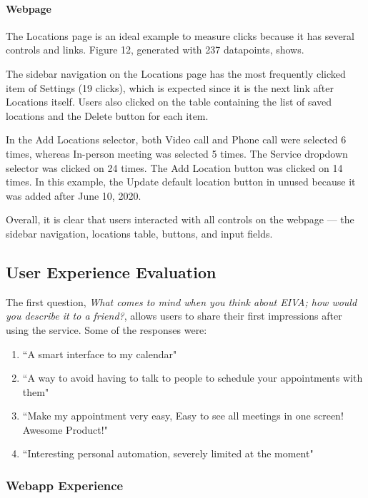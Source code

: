\documentclass{article}
\begin{document}
\paragraph{Webpage}

The Locations page is an ideal example to measure clicks because it has several controls and links. Figure 12, generated with 237 datapoints, shows.

The sidebar navigation on the Locations page has the most frequently clicked item of Settings (19 clicks), which is expected since it is the next link after Locations itself. Users also clicked on the table containing the list of saved locations and the Delete button for each item.

In the Add Locations selector, both Video call and Phone call were selected 6 times, whereas In-person meeting was selected 5 times. The Service dropdown selector was clicked on 24 times. The Add Location button was clicked on 14 times. In this example, the Update default location button in unused because it was added after June 10, 2020.

Overall, it is clear that users interacted with all controls on the webpage --- the sidebar navigation, locations table, buttons, and input fields.

\subsection{User Experience Evaluation}

The first question, \emph{What comes to mind when you think about EIVA; how would you describe it to a friend?}, allows users to share their first impressions after using the service. Some of the responses were:

\begin{enumerate}
	\item ``A smart interface to my calendar"
	\item ``A way to avoid having to talk to people to schedule your appointments with them"
	\item ``Make my appointment very easy, Easy to see all meetings in one screen! Awesome Product!"
	\item ``Interesting personal automation, severely limited at the moment"
\end{enumerate}

\subsubsection{Webapp Experience}
\end{document}
